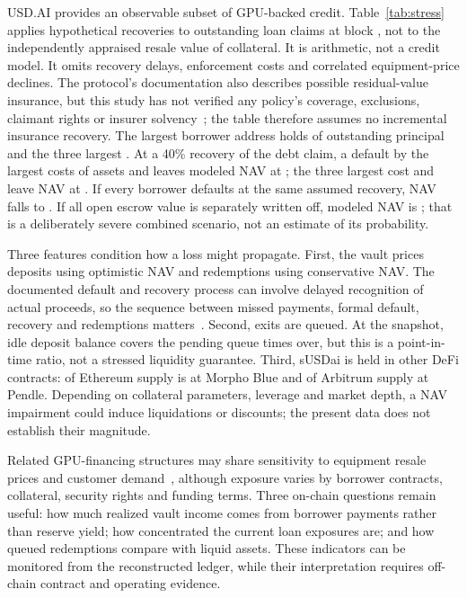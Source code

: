 USD.AI provides an observable subset of GPU-backed credit. Table~\ref{tab:stress} applies hypothetical recoveries to outstanding loan claims at block \StateBlock{}, not to the independently appraised resale value of collateral. It is arithmetic, not a credit model. It omits recovery delays, enforcement costs and correlated equipment-price declines. The protocol's documentation also describes possible residual-value insurance, but this study has not verified any policy's coverage, exclusions, claimant rights or insurer solvency~\cite{usdaidocs}; the table therefore assumes no incremental insurance recovery. The largest borrower address holds \TopOneOut{} of outstanding principal and the three largest \TopThreeOut{}. At a 40\% recovery of the debt claim, a default by the largest costs \StressOnePct{} of assets and leaves modeled NAV at \StressOneNAV{}; the three largest cost \StressThreePct{} and leave NAV at \StressThreeNAV{}. If every borrower defaults at the same assumed recovery, NAV falls to \StressAllNAV{}. If all open escrow value is separately written off, modeled NAV is \StressWorstNAV{}; that is a deliberately severe combined scenario, not an estimate of its probability.

\begin{table}[t]
\caption{Illustrative vault loss scenarios. Recovery percentages apply to outstanding loan claims, not to gross stated GPU collateral values; insurance proceeds are excluded.}
\label{tab:stress}
\centering
\scriptsize
\resizebox{\columnwidth}{!}{}
\end{table}

Three features condition how a loss might propagate. First, the vault prices deposits using optimistic NAV and redemptions using conservative NAV. The documented default and recovery process can involve delayed recognition of actual proceeds, so the sequence between missed payments, formal default, recovery and redemptions matters~\cite{usdaidocs}. Second, exits are queued. At the snapshot, idle deposit balance covers the pending queue \IdleOverPending{} times over, but this is a point-in-time ratio, not a stressed liquidity guarantee. Third, sUSDai is held in other DeFi contracts: \EthMorpho{} of Ethereum supply is at Morpho Blue and \PendleArb{} of Arbitrum supply at Pendle. Depending on collateral parameters, leverage and market depth, a NAV impairment could induce liquidations or discounts; the present data does not establish their magnitude.

Related GPU-financing structures may share sensitivity to equipment resale prices and customer demand~\cite{gaib2025}, although exposure varies by borrower contracts, collateral, security rights and funding terms. Three on-chain questions remain useful: how much realized vault income comes from borrower payments rather than reserve yield; how concentrated the current loan exposures are; and how queued redemptions compare with liquid assets. These indicators can be monitored from the reconstructed ledger, while their interpretation requires off-chain contract and operating evidence.

